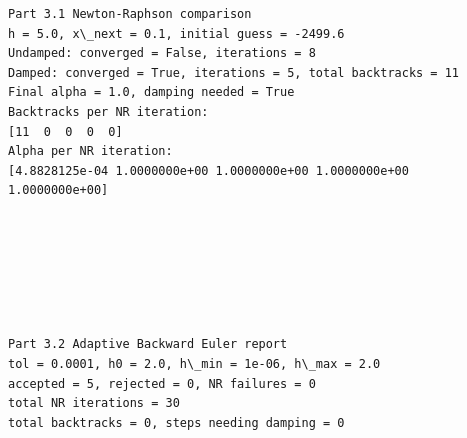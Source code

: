 \documentclass[11pt]{article}
\begin{document}
    \begin{Verbatim}[commandchars=\\\{\}]
Part 3.1 Newton-Raphson comparison
h = 5.0, x\_next = 0.1, initial guess = -2499.6
Undamped: converged = False, iterations = 8
Damped: converged = True, iterations = 5, total backtracks = 11
Final alpha = 1.0, damping needed = True
Backtracks per NR iteration:
[11  0  0  0  0]
Alpha per NR iteration:
[4.8828125e-04 1.0000000e+00 1.0000000e+00 1.0000000e+00 1.0000000e+00]
    \end{Verbatim}

    \begin{center}
    \end{center}
    { \hspace*{\fill} \\}
    
    \begin{center}
    \end{center}
    { \hspace*{\fill} \\}
    
    \begin{center}
    \end{center}
    { \hspace*{\fill} \\}
    
    \begin{Verbatim}[commandchars=\\\{\}]

Part 3.2 Adaptive Backward Euler report
tol = 0.0001, h0 = 2.0, h\_min = 1e-06, h\_max = 2.0
accepted = 5, rejected = 0, NR failures = 0
total NR iterations = 30
total backtracks = 0, steps needing damping = 0
    \end{Verbatim}

    \begin{center}
    \end{center}
    { \hspace*{\fill} \\}
    
    \begin{center}
    \end{center}
    { \hspace*{\fill} \\}
    
\end{document}
